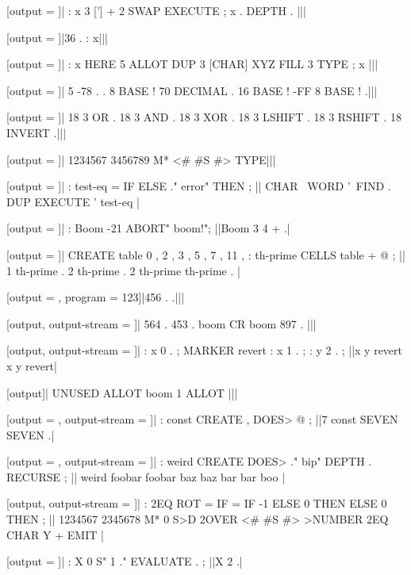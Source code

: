 [output = \result]|
  : x 3 ['] + 2 SWAP EXECUTE ; x . DEPTH .
|||
\typeout{\result}

[output = \result]|36 . : x|||
\typeout{\result}

[output = \result]|
  : x HERE 5 ALLOT DUP 3 [CHAR] XYZ FILL 3 TYPE ; x |||
\typeout{\result}

[output = \result]|
  5 -78 . .
  8 BASE ! 70 DECIMAL .
  16 BASE ! -FF 8 BASE ! .|||
\typeout{\result}

[output = \result]|
  18 3 OR .
  18 3 AND .
  18 3 XOR .
  18 3 LSHIFT .
  18 3 RSHIFT .
  18 INVERT .|||
\typeout{\result}

[output = \result]|
  1234567 3456789 M* <# #S #> TYPE|||
\typeout{\result}

[output = \result]|
  : test-eq = IF ELSE ." error" THEN ;
||
  CHAR \ WORD '\ FIND . DUP EXECUTE ' test-eq
|
\typeout{\result}

[output = \result]|
  : Boom -21 ABORT" boom!";
||Boom 3 4 + .|
\typeout{\result}

[output = \result]|
  CREATE table 0 , 2 , 3 , 5 , 7 , 11 ,
  : th-prime CELLS table + @ ;
||
  1 th-prime .
  2 th-prime .
  2 th-prime th-prime .
|
\typeout{\result}

[output = \result, program = {123}]|456 . .|||
\typeout{\result}

[output, output-stream = \z@]|
  564 . 453 . boom CR boom 897 .
|||

[output, output-stream = \z@]|
  : x 0 . ;
  MARKER revert
  : x 1 . ;
  : y 2 . ;
||x y revert x y revert|

[output]|
  UNUSED ALLOT boom 1 ALLOT
|||

[output = \result, output-stream = \z@]|
  : const CREATE , DOES> @ ;
||7 const SEVEN SEVEN .|
\typeout{\result}

[output = \result, output-stream = \z@]|
  : weird CREATE DOES> ." bip" DEPTH . RECURSE ;
||
  weird foobar foobar baz baz bar bar boo
|
\typeout{\result}

[output, output-stream = \z@]|
  : 2EQ ROT = IF = IF -1 ELSE 0 THEN ELSE 0 THEN ;
||
  1234567 2345678 M*
  0 S>D
  2OVER <# #S #> >NUMBER
  2EQ CHAR Y + EMIT
|

[output = \result]|
  : X 0 S" 1 ." EVALUATE . ;
||X 2 .|
\typeout{\result}

